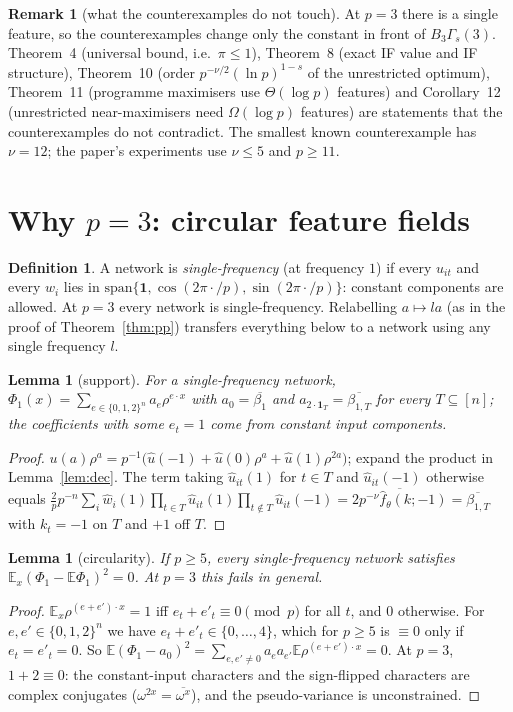 \documentclass[11pt]{article}
\newtheorem{lemma}[theorem]{Lemma}
\theoremstyle{definition}
\newtheorem{definition}[theorem]{Definition}
\newtheorem{remark}[theorem]{Remark}
\newcommand{\E}{\mathbb{E}}
\begin{document}
\begin{remark}[what the counterexamples do not touch]
At $p=3$ there is a single feature, so the counterexamples change only the constant in front of $B_3\Gamma_s(3)$.
Theorem~4 (universal bound, i.e.\ $\pi\le1$), Theorem~8 (exact IF value and IF structure), Theorem~10 (order
$p^{-\nu/2}(\ln p)^{1-s}$ of the unrestricted optimum), Theorem~11 (programme maximisers use $\Theta(\log p)$ features) and
Corollary~12 (unrestricted near-maximisers need $\Omega(\log p)$ features) are statements that the counterexamples do not
contradict.  The smallest known counterexample has $\nu=12$; the paper's experiments use $\nu\le5$ and $p\ge11$.
\end{remark}

\section{Why $p=3$: circular feature fields}
\begin{definition}
A network is \emph{single-frequency} (at frequency $1$) if every $u_{it}$ and every $w_i$ lies in
$\mathrm{span}\{\mathbf 1,\cos(2\pi\cdot/p),\sin(2\pi\cdot/p)\}$: constant components are allowed.  At $p=3$ every
network is single-frequency.  Relabelling $a\mapsto la$ (as in the proof of Theorem~\ref{thm:pp}) transfers everything
below to a network using any single frequency $l$.
\end{definition}

\begin{lemma}[support]\label{lem:supp}
For a single-frequency network, $\Phi_1(x)=\sum_{e\in\{0,1,2\}^n}a_e\rho^{e\cdot x}$ with $a_0=\overline{\beta_1}$ and
$a_{2\cdot\mathbf 1_T}=\overline{\beta_{1,T}}$ for every $T\subseteq[n]$; the coefficients with some $e_t=1$ come from
constant input components.
\end{lemma}
\begin{proof}
$u(a)\rho^{a}=p^{-1}\big(\hat u(-1)+\hat u(0)\rho^{a}+\hat u(1)\rho^{2a}\big)$; expand the product in
Lemma~\ref{lem:dec}.  The term taking $\hat u_{it}(1)$ for $t\in T$ and $\hat u_{it}(-1)$ otherwise equals
$\frac2pp^{-n}\sum_i\hat w_i(1)\prod_{t\in T}\hat u_{it}(1)\prod_{t\notin T}\hat u_{it}(-1)
=\overline{2p^{-\nu}\hat f_\theta(k;-1)}=\overline{\beta_{1,T}}$ with $k_t=-1$ on $T$ and $+1$ off $T$.
\end{proof}

\begin{lemma}[circularity]\label{lem:circ}
If $p\ge5$, every single-frequency network satisfies $\E_x(\Phi_1-\E\Phi_1)^2=0$.  At $p=3$ this fails in general.
\end{lemma}
\begin{proof}
$\E_x\rho^{(e+e')\cdot x}=1$ iff $e_t+e'_t\equiv0\pmod p$ for all $t$, and $0$ otherwise.  For
$e,e'\in\{0,1,2\}^n$ we have $e_t+e'_t\in\{0,\dots,4\}$, which for $p\ge5$ is $\equiv0$ only if $e_t=e'_t=0$.  So
$\E(\Phi_1-a_0)^2=\sum_{e,e'\ne0}a_ea_{e'}\E\rho^{(e+e')\cdot x}=0$.  At $p=3$, $1+2\equiv0$: the constant-input
characters and the sign-flipped characters are complex conjugates ($\omega^{2x}=\overline{\omega^{x}}$), and the
pseudo-variance is unconstrained.
\end{proof}
\end{document}

